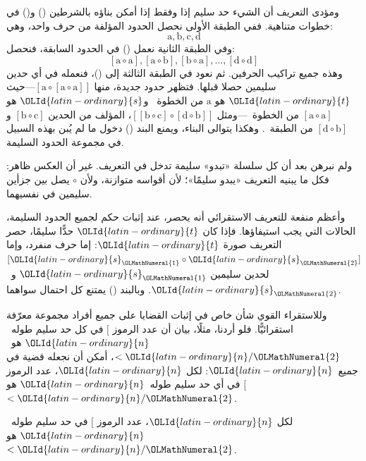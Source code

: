 \documentclass[../../../include/open-logic-section]{subfiles}
\begin{document}
ومؤدى التعريف أن الشيء حد سليم إذا وفقط إذا أمكن بناؤه بالشرطين ()
و() في خطوات متناهية. ففي الطبقة الأولى نحصل الحدود المؤلفة من حرف
واحد، وهي:
\[
\mathrm{a}, \mathrm{b}, \mathrm{c}, \mathrm{d}
\]
وفي الطبقة الثانية نعمل () في الحدود السابقة، فنحصل:
\[
[\mathrm{a} \circ \mathrm{a}], [\mathrm{a} \circ \mathrm{b}],
[\mathrm{b} \circ \mathrm{a}], \dots, [\mathrm{d} \circ \mathrm{d}]
\]
وهذه جميع تراكيب الحرفين. ثم نعود في الطبقة الثالثة إلى ()، فنعمله
في أي حدين سليمين حصلا قبلها. فتظهر حدود جديدة، منها
$[\mathrm{a} \circ [\mathrm{a} \circ \mathrm{a}]]$---حيث ${\OLId{latin-ordinary}{t}}$ هو
$\mathrm{a}$ من الخطوة~ و${\OLId{latin-ordinary}{s}}$ هو
$[\mathrm{a} \circ \mathrm{a}]$ من الخطوة~---ومثل
$[[\mathrm{b} \circ \mathrm{c}] \circ [\mathrm{d} \circ
\mathrm{b}]]$، المؤلف من الحدين $[\mathrm{b} \circ \mathrm{c}]$
و$[\mathrm{d} \circ \mathrm{b}]$ من الطبقة~. وهكذا يتوالى البناء،
ويمنع البند () دخول ما لم يُبن بهذه السبيل في مجموعة الحدود السليمة.

ولم نبرهن بعد أن كل سلسلة «تبدو» سليمة تدخل في التعريف. غير أن العكس
ظاهر: فكل ما يبنيه التعريف «يبدو سليمًا»؛ لأن أقواسه متوازنة، ولأن
$\circ$ يصل بين جزأين سليمين في نفسيهما.

وأعظم منفعة للتعريف الاستقرائي أنه يحصر، عند إثبات حكم لجميع الحدود
السليمة، الحالات التي يجب استيفاؤها. فإذا كان ${\OLId{latin-ordinary}{t}}$ حدًّا سليمًا، حصر
التعريف صورة ${\OLId{latin-ordinary}{t}}$: إما حرف منفرد، وإما $[{\OLId{latin-ordinary}{s}}_{\OLMathNumeral{1}} \circ {\OLId{latin-ordinary}{s}}_{\OLMathNumeral{2}}]$ لحدين سليمين
${\OLId{latin-ordinary}{s}}_{\OLMathNumeral{1}}$ و~${\OLId{latin-ordinary}{s}}_{\OLMathNumeral{2}}$. وبالبند () يمتنع كل احتمال سواهما.

وللاستقراء القوي شأن خاص في إثبات القضايا على جميع أفراد مجموعة
معرّفة استقرائيًّا. فلو أردنا، مثلًا، بيان أن عدد الرموز $[$ في كل حد
سليم طوله~${\OLId{latin-ordinary}{n}}$ هو~$< {\OLId{latin-ordinary}{n}}/{\OLMathNumeral{2}}$، أمكن أن نجعله قضية في جميع~${\OLId{latin-ordinary}{n}}$: لكل ${\OLId{latin-ordinary}{n}}$،
عدد الرموز $[$ في أي حد سليم طوله~${\OLId{latin-ordinary}{n}}$ هو $< {\OLId{latin-ordinary}{n}}/{\OLMathNumeral{2}}$.

\begin{prop}
  لكل ${\OLId{latin-ordinary}{n}}$، عدد الرموز $[$ في حد سليم طوله~${\OLId{latin-ordinary}{n}}$ هو $< {\OLId{latin-ordinary}{n}}/{\OLMathNumeral{2}}$.
\end{prop}
\end{document}
